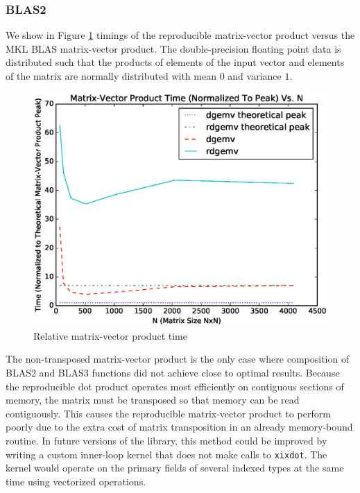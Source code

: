   \subsubsection{BLAS2}
    We show in Figure \ref{fig:gemv_timings} timings of the reproducible matrix-vector product versus the MKL BLAS matrix-vector product. The double-precision floating point data is distributed such that the products of elements of the input vector and elements of the matrix are normally distributed with mean $0$ and variance $1$.
  \begin{figure}[H]
  \begin{center}
  \includegraphics[width=\textwidth]{plots/gemv_comparison}
  \caption{Relative matrix-vector product time}
  \label{fig:gemv_timings}
  \end{center}
  \end{figure}
  The non-transposed matrix-vector product is the only case where composition of BLAS2 and BLAS3 functions did not achieve close to optimal results. Because the reproducible dot product operates most efficiently on contiguous sections of memory, the matrix must be transposed so that memory can be read contiguously. This causes the reproducible matrix-vector product to perform poorly due to the extra cost of matrix transposition in an already memory-bound routine. In future versions of the library, this method could be improved by writing a custom inner-loop kernel that does not make calls to \texttt{xixdot}. The kernel would operate on the primary fields of several indexed types at the same time using vectorized operations.

